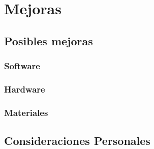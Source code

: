 \chapter{Mejoras}

\section{Posibles mejoras}
\subsection{Software}
\subsection{Hardware}
\subsection{Materiales}
\section{Consideraciones Personales}